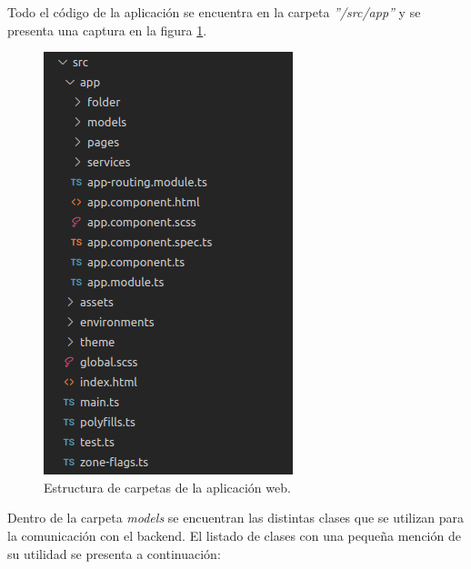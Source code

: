 Todo el código de la aplicación se encuentra en la carpeta \textit{''/src/app''} y se presenta una captura en la figura \ref{fig:Carpetas página web.}.


\begin{figure}[ht]
	\centering
	\includegraphics[scale=.60]{./Figures/codigoFront.png}
	\caption{Estructura de carpetas de la aplicación web.}
	\label{fig:Carpetas página web.}
\end{figure}


Dentro de la carpeta \textit{models} se encuentran las distintas clases que se utilizan para la comunicación con el backend. El listado de clases con una pequeña mención de su utilidad se presenta a continuación:

